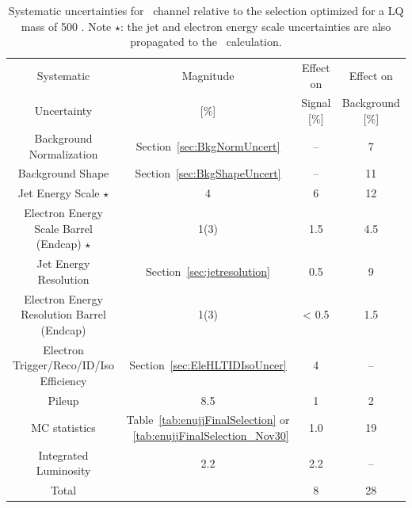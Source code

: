 \begin{table}
  \begin{center}
    \small
    \begin{tabular}{c|c|c|c} 
      Systematic  & Magnitude  & Effect on      & Effect on \\
      Uncertainty &     [\%]           & Signal [\%]  & Background [\%] \\                   
      \hline\hline
      Background Normalization & Section~\ref{sec:BkgNormUncert} & -- &  7 \\
      Background Shape & Section~\ref{sec:BkgShapeUncert} & -- &  11 \\
      Jet Energy Scale $\star$ & 4 & 6 & 12 \\
      Electron Energy Scale Barrel (Endcap)  $\star$ & 1(3) & 1.5 & 4.5 \\
      Jet Energy Resolution & Section~\ref{sec:jetresolution}& 0.5 & 9 \\
      Electron Energy Resolution Barrel (Endcap) & 1(3) & < 0.5 & 1.5 \\
      Electron Trigger/Reco/ID/Iso Efficiency & Section~\ref{sec:EleHLTIDIsoUncer} & 4 & -- \\
      Pileup   & 8.5 & 1 & 2 \\  
      MC statistics & Table~\ref{tab:enujjFinalSelection} or ~\ref{tab:enujjFinalSelection_Nov30}  & 1.0 & 19 \\
      Integrated Luminosity & 2.2 & 2.2 & -- \\
      \hline
      Total & & 8 & 28 \\
    \end{tabular}
  \caption{Systematic uncertainties for \enujj~channel relative to the selection optimized 
    for a LQ mass of 500 \GeV. Note $\star$: the 
    jet and electron energy scale uncertainties are also propagated to the \MET~calculation.}
  \label{tab:enujjSystematics}
  \end{center}
\end{table}
